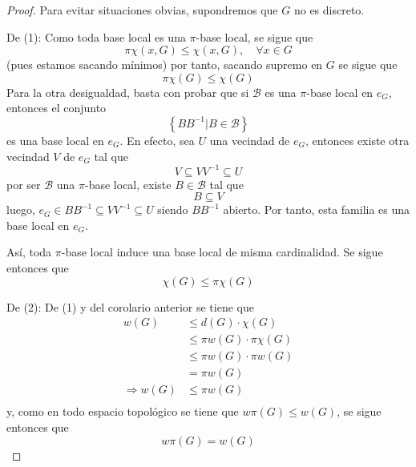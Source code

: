 \documentclass[12pt]{report}
\theoremstyle{largebreak}
\begin{document}
    \begin{proof}
        Para evitar situaciones obvias, supondremos que $G$ no es discreto.
        
        De (1): Como toda base local es una $\pi$-base local, se sigue que
        \begin{equation*}
            \pi\chi(x,G)\leq\chi(x,G),\quad\forall x\in G
        \end{equation*}
        (pues estamos sacando mínimos) por tanto, sacando supremo en $G$ se sigue que
        \begin{equation*}
            \pi\chi(G)\leq\chi(G)
        \end{equation*}
        Para la otra desigualdad, basta con probar que si $\mathcal{B}$ es una $\pi$-base local en $e_G$, entonces el conjunto
        \begin{equation*}
            \left\{BB^{-1}\Big|B\in\mathcal{B} \right\}
        \end{equation*}
        es una base local en $e_G$. En efecto, sea $U$ una vecindad de $e_G$, entonces existe otra vecindad $V$ de $e_G$ tal que
        \begin{equation*}
            V\subseteq VV^{-1}\subseteq U
        \end{equation*}
        por ser $\mathcal{B}$ una $\pi$-base local, existe $B\in\mathcal{B}$ tal que
        \begin{equation*}
            B\subseteq V
        \end{equation*}
        luego, $e_G\in BB^{-1}\subseteq VV^{-1}\subseteq U$ siendo $BB^{-1}$ abierto. Por tanto, esta familia es una base local en $e_G$.

        Así, toda $\pi$-base local induce una base local de misma cardinalidad. Se sigue entonces que
        \begin{equation*}
            \chi(G)\leq\pi\chi(G)
        \end{equation*}

        De (2): De (1) y del corolario anterior se tiene que
        \begin{equation*}
            \begin{split}
                w(G)&\leq d(G)\cdot\chi(G)\\
                &\leq\pi w(G)\cdot \pi\chi(G)\\
                &\leq\pi w(G)\cdot\pi w(G)\\
                &=\pi w(G)\\
                \Rightarrow w(G)&\leq \pi w(G)\\
            \end{split}
        \end{equation*}
        y, como en todo espacio topológico se tiene que $w\pi(G)\leq w(G)$, se sigue entonces que
        \begin{equation*}
            w\pi(G)= w(G) 
        \end{equation*}
    \end{proof}
\end{document}
